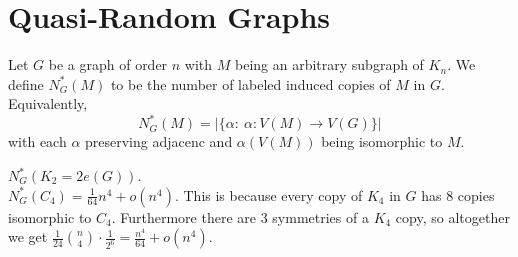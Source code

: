 \section{Quasi-Random Graphs}
\begin{definition}
	Let \(G\) be a graph of order \(n\) with \(M\) being an arbitrary subgraph of \(K_{n} \). We define \(N_{G}^{*}\left( M \right) \) to be the number of labeled induced copies of \(M\) in \(G\). Equivalently, \[N_{G}^{*} \left( M \right) = \left| \{\alpha :  \ \alpha : V\left( M \right) \to V\left( G \right) \}   \right| \] with each \(\alpha\) preserving adjacenc and \(\alpha\left( V\left( M \right)  \right) \) being isomorphic to \(M\).
\end{definition}
\begin{example}
	\(N_{G}^{*}\left( K_{2}  = 2e\left( G \right)  \right) \).\\
	\(N_{G}^{*}\left( C_4 \right)  = \frac{1}{64}n^{4} + o\left( n^{4} \right) \). This is because every copy of \(K_{4} \) in \(G\) has \(8\) copies isomorphic to \(C_4\). Furthermore there are \(3\) symmetries of a \(K_{4} \) copy, so altogether we get \(\frac{1}{24}\binom{n}{4}\cdot\frac{1}{2^{6}} = \frac{n^{4}}{64} + o\left( n^{4} \right) \).
\end{example}
